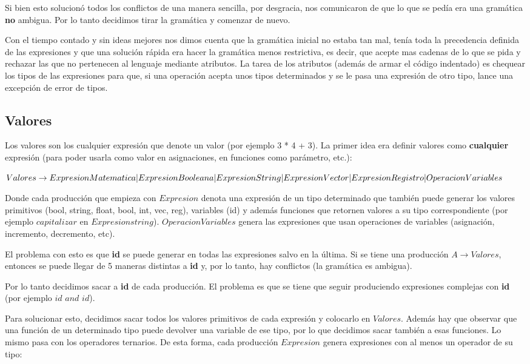 Si bien esto solucionó todos los conflictos de una manera sencilla, por desgracia, nos comunicaron de que lo que se pedía era una gramática \textbf{no} ambigua. Por lo tanto decidimos tirar la gramática y comenzar de nuevo.

Con el tiempo contado y sin ideas mejores nos dimos cuenta que la gramática inicial no estaba tan mal, tenía toda la precedencia definida de las expresiones y que una solución rápida era hacer la gramática menos restrictiva, es decir, que acepte mas cadenas de lo que se pida y rechazar las que no pertenecen al lenguaje mediante atributos. La tarea de los atributos (además de armar el código indentado) es chequear los tipos de las expresiones para que, si una operación acepta unos tipos determinados y se le pasa una expresión de otro tipo, lance una excepción de error de tipos.

\subsection{Valores}
Los valores son los cualquier expresión que denote un valor (por ejemplo 3 * 4 + 3). La primer idea era definir valores como \textbf{cualquier} expresión (para poder usarla como valor en asignaciones, en funciones como parámetro, etc.):

$Valores \rightarrow ExpresionMatematica | ExpresionBooleana | ExpresionString | ExpresionVector | \\ ExpresionRegistro | OperacionVariables $

Donde cada producción que empieza con $Expresion$ denota una expresión de un tipo determinado que también puede generar los valores primitivos (bool, string, float, bool, int, vec, reg), variables (id) y además funciones que retornen valores a su tipo correspondiente (por ejemplo $capitalizar$ en $Expresionstring$). $OperacionVariables$ genera las expresiones que usan operaciones de variables (asignación, incremento, decremento, etc). 

El problema con esto es que \textbf{id} se puede generar en todas las expresiones salvo en la última. Si se tiene una producción $A \rightarrow Valores$, entonces se puede llegar de 5 maneras distintas a \textbf{id} y, por lo tanto, hay conflictos (la gramática es ambigua).

Por lo tanto decidimos sacar a \textbf{id} de cada producción. El problema es que se tiene que seguir produciendo expresiones complejas con \textbf{id} (por ejemplo $id$ $and$ $id$).

Para solucionar esto, decidimos sacar todos los valores primitivos de cada expresión y colocarlo en $Valores$. Además hay que observar que una función de un determinado tipo puede devolver una variable de ese tipo, por lo que decidimos sacar también a esas funciones. Lo mismo pasa con los operadores ternarios. De esta forma, cada producción $Expresion$ genera expresiones con al menos un operador de su tipo:

